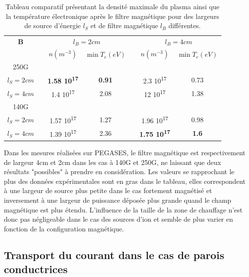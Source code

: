 \begin{refsection}
\begin{table}
\footnotesize\centering
{}
\begin{tabular}{@{}ccccccc@{}}\toprule
\bfseries B&&\multicolumn{2}{c}{$l_B=2cm$} && \multicolumn{2}{c}{$l_B=4cm$}\\
\cmidrule{3-4} \cmidrule{6-7}
&& $n (m^{-3})$ & $\min T_e (eV)$ && $n (m^{-3})$ & $\min T_e (eV)$\\
\midrule 
250G\\
\scriptsize $l_S=2cm$ &&\bfseries\scriptsize 1.58
10\textsuperscript{17}&\bfseries\scriptsize 0.91&&\scriptsize 2.3
10\textsuperscript{17}&\scriptsize 0.73
\\
\scriptsize $l_S=4cm$  &&\scriptsize 1.4 10\textsuperscript{17} &\scriptsize
2.08&&\scriptsize 12 10\textsuperscript{17}&\scriptsize 1.38\\
140G\\
\scriptsize $l_S=2cm$ &&\scriptsize 1.57 10\textsuperscript{17} &\scriptsize
1.27&&\scriptsize 1.96 10\textsuperscript{17}&\scriptsize 0.98 \\
\scriptsize $l_S=4cm$  &&\scriptsize 1.39 10\textsuperscript{17} &\scriptsize
2.36&&\bfseries\scriptsize 1.75 10\textsuperscript{17}&\bfseries\scriptsize
1.6\\
\bottomrule
\end{tabular}
\caption{Tableau comparatif présentant la densité maximale du plasma ainsi que
la température électronique après le filtre magnétique pour des largeurs de
source d'énergie $l_S$ et de filtre magnétique $l_B$ différentes.}
\label{4-pegasesCompLargeurs}
\end{table}

Dans les mesures réalisées sur PEGASES, le filtre magnétique est respectivement
de largeur 4cm et 2cm dans les cas à 140G et 250G, ne laissant que deux
résultats "possibles" à prendre en considération. 
Les valeurs se rapprochant le plus des données expérimentales sont en gras dans
le tableau, elles correspondent à une largeur de source plus petite dans le cas fortement
magnétisé et inversement à une largeur de puissance déposée plus grande quand le
champ magnétique est plus étendu. L'influence de la taille de la zone de
chauffage n'est donc pas négligeable dans le cas des sources d'ion et semble de
plus varier en fonction de la configuration magnétique.

\subsection{Transport du courant dans le cas de parois conductrices}


\end{refsection}
